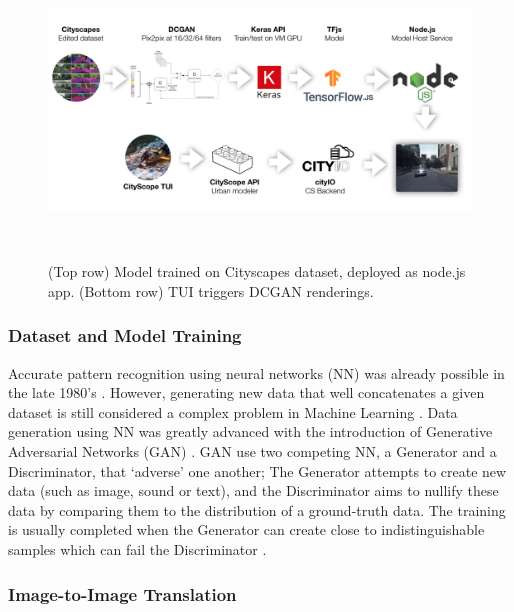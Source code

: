 {    \begin{figure}[!htb]
        \centering
        \includegraphics[width=1\textwidth]{chapters/prediction/deepscope/figures/deepscope0.jpg}\caption{(Top row) Model trained on Cityscapes dataset, deployed as node.js app. (Bottom row) TUI triggers DCGAN renderings.}~\label{fig:deepscope_arch}
    \end{figure}

    \subsubsection{Dataset and Model Training}\label{model-and-data}
    {
        Accurate pattern recognition using neural networks (NN) was already possible in the late 1980's \cite{lecun1989backpropagation}. However, generating new data that well concatenates a given dataset is still considered a complex problem in Machine Learning \cite{creswell2018generative}. Data generation using NN was greatly advanced with the introduction of Generative Adversarial Networks (GAN) \cite{Goodfellow2013}. GAN use two competing NN, a Generator and a Discriminator, that `adverse' one another; The Generator attempts to create new data (such as image, sound or text), and the Discriminator aims to nullify these data by comparing them to the distribution of a ground-truth data. The training is usually completed when the Generator can create close to indistinguishable samples which can fail the Discriminator \cite{pix2pix2016}.
    }


    \subsubsection{Image-to-Image Translation}\label{image-to-image-translation}

}
